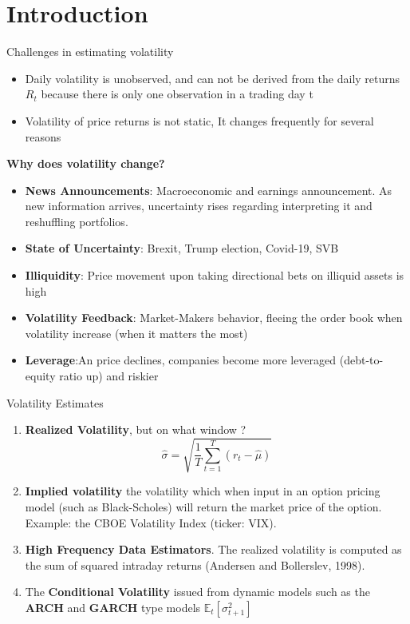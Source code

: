 \documentclass{beamer}
\def\Esp{\mathbb{E}}
\newcommand{\imfbold}[1]{\textbf{\textcolor{imfblue}{#1}}}
\begin{document}
\section{Introduction}
\begin{frame}{Challenges in estimating volatility}
\small
    \begin{itemize}
        \item Daily volatility is unobserved, and can not be derived from the daily returns $R_t$ because there is only one observation in a trading day t
        \item Volatility of price returns is not static, It changes frequently for several reasons
    \end{itemize}
    
\textbf{Why does volatility change?}
     \begin{itemize}
         \item \imfbold{News Announcements}: Macroeconomic and earnings announcement. As new information arrives, uncertainty rises regarding interpreting it and reshuffling portfolios.
         \item \imfbold{State of Uncertainty}: Brexit, Trump election, Covid-19, SVB 
         \item \imfbold{Illiquidity}: Price movement upon taking directional bets on illiquid assets is high 
         \item \imfbold{Volatility Feedback}: Market-Makers behavior, fleeing the order book when volatility increase (when it matters the most)
         \item \imfbold{Leverage}:An price declines, companies become more
leveraged (debt-to-equity ratio up) and riskier
     \end{itemize}
\end{frame}
\begin{frame}{Volatility Estimates}
    \begin{enumerate}
    \item \imfbold{ Realized Volatility}, but on what window ?
        $$ \hat{\sigma} = \sqrt{ \frac{1}{T} \sum_{t=1}^T (r_t - \hat{\mu})}$$
    
    \item \imfbold{Implied volatility} the volatility which when input in an option pricing model (such as Black-Scholes) will return the market price of the option. Example: the CBOE Volatility Index (ticker: VIX).
    \item \imfbold{High Frequency Data Estimators}. The realized volatility is computed as the sum of squared intraday returns (Andersen and Bollerslev, 1998).
\item The \imfbold{Conditional Volatility} issued from dynamic models such as the \textbf{ARCH} and \textbf{GARCH} type models $\Esp_t[\sigma_{t+1}^2]$
 
\end{enumerate}
\end{frame}
\end{document}
